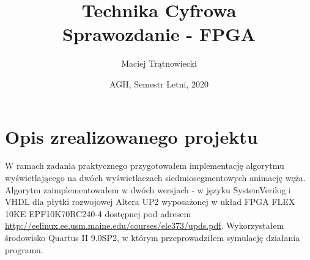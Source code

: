 \documentclass{article}
\title{Technika Cyfrowa\\
Sprawozdanie - FPGA}
\author{Maciej Trątnowiecki}
\date{AGH, Semestr Letni, 2020}
\begin{document}
    \maketitle
    \section{Opis zrealizowanego projektu}
        W ramach zadania praktycznego przygotowałem implementację algorytmu wyświetlającego na dwóch wyświetlaczach siedmiosegmentowych animację węża. Algorytm zaimplementowałem w dwóch wersjach - w języku SystemVerilog i VHDL dla płytki rozwojowej Altera UP2 wyposażonej w układ FPGA FLEX 10KE EPF10K70RC240-4 dostępnej pod adresem \url{http://eelinux.ee.usm.maine.edu/courses/ele373/upds.pdf}. Wykorzystałem środowisko Quartus II 9.0SP2, w którym przeprowadziłem symulację działania programu. \\
        
\end{document}
